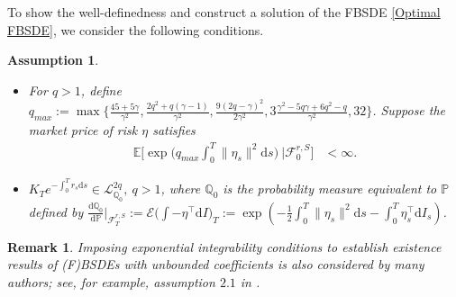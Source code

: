 \documentclass[12,reqno]{amsart}
\numberwithin{equation}{section}
\newtheorem{remark}[defi]{Remark}
\newtheorem{assum}[defi]{Assumption}
\begin{document}
To show the well-definedness and construct a solution of the FBSDE \eqref{Optimal FBSDE}, we consider the following conditions.
\begin{assum}\leavevmode\label{Change of measure}
	\begin{itemize}
		\item[$(i)$] For $q>1$, define $q_{max}:=\max\Big\{\frac{45+5\gamma}{\gamma^{2}},\frac{2q^{2}+q(\gamma-1)}{\gamma^{2}},\frac{9(2q-\gamma)^{2}}{2\gamma^{2}},3\frac{\gamma^{2}-5q\gamma+6q^{2}-q}{\gamma^{2}},32\Big\}$. Suppose the market price of risk $\eta$ satisfies
		\begin{align}
			\mathbb{E}\Big[\exp\Big(q_{max}\int_{0}^{T}\|\eta_{s}\|^{2}\mathrm{d}s\Big)~\big|\mathcal{F}_{0}^{r,S}\Big]&<\infty.
		\end{align}
		\item[$(ii)$]  $K_{T}e^{-\int_{0}^{T}r_{s}\mathrm{d}s}\in\mathcal{L}_{\mathbb{Q}_{0}}^{2q},~{q>1}$, where $\mathbb{Q}_{0}$ is the probability measure equivalent to $\mathbb{P}$ defined by $\frac{\mathrm{d}\mathbb{Q}_{0}}{\mathrm{d}\mathbb{P}}\big|_{\mathcal{F}_{T}^{r,S}}:=\mathcal{E}\big(\int-\eta^{\top}\mathrm{d}I\big)_{T}:=\exp\left(-\frac{1}{2}\int_{0}^{T}\|\eta_{s}\|^{2}\mathrm{d}s-\int_{0}^{T}\eta_{s}^{\top}\mathrm{d}I_{s} \right)$.
	\end{itemize}
\end{assum}
\begin{remark}\label{Some remarks on the exponential integrability conditions}%
	Imposing exponential integrability conditions to establish existence results of (F)BSDEs with unbounded coefficients is also considered by many authors; see, for example, assumption $2.1$ in \cite{feng2026consumption,sun2020mean,xing2017consumption}.
\end{remark}
\end{document}
